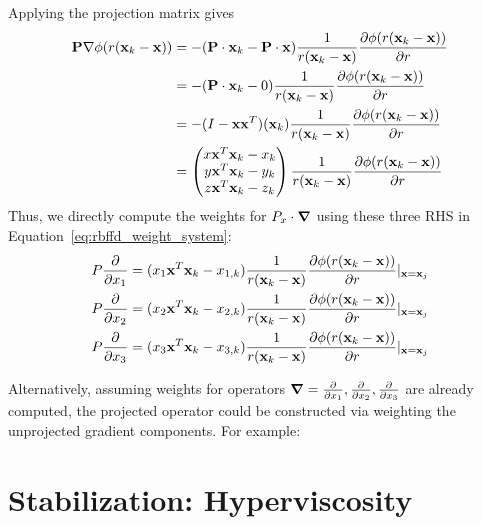 \documentclass{report}
\begin{document}
{Applying the projection matrix gives 
\begin{align*}
\mathbf{P} \nabla \phi(r(\mathbf{x}_k - \mathbf{x})) & = - (\mathbf{P} \cdot \mathbf{x}_k - \mathbf{P}\cdot\mathbf{x})\frac{1}{r(\mathbf{x}_k - \mathbf{x})} \frac{\partial \phi(r(\mathbf{x}_k - \mathbf{x}))}{\partial r} \\
& =  - (\mathbf{P}\cdot\mathbf{x}_k - 0)\frac{1}{r(\mathbf{x}_k - \mathbf{x})} \frac{\partial \phi(r(\mathbf{x}_k - \mathbf{x}))}{\partial r} \\
& = - (I-\mathbf{x}\mathbf{x}^T)(\mathbf{x}_k
)\frac{1}{r(\mathbf{x}_k - \mathbf{x})} \frac{\partial \phi(r(\mathbf{x}_k - \mathbf{x}))}{\partial r} \\
& = \begin{pmatrix} x \mathbf{x}^T \mathbf{x}_k - x_k \\ y \mathbf{x}^T \mathbf{x}_k -  y_k \\ z \mathbf{x}^T \mathbf{x}_k -z_k \end{pmatrix} \frac{1}{r(\mathbf{x}_k - \mathbf{x})} \frac{\partial \phi(r(\mathbf{x}_k - \mathbf{x}))}{\partial r} 
 \end{align*}
Thus, we directly compute the weights for $P_{x}\cdot\mbox{\boldmath$ \nabla $}$ using these three RHS in Equation~\ref{eq:rbffd_weight_system}: 
\begin{align} 
P\frac{\partial }{\partial x_1} = ( x_1 \mathbf{x}^T \mathbf{x}_k - x_{1,k}) \frac{1}{r(\mathbf{x}_k - \mathbf{x})} \frac{\partial \phi(r(\mathbf{x}_k - \mathbf{x}))}{\partial r} |_{\mathbf{x}=\mathbf{x}_j} \\
P\frac{\partial }{\partial x_2} = ( x_2 \mathbf{x}^T \mathbf{x}_k - x_{2,k}) \frac{1}{r(\mathbf{x}_k - \mathbf{x})} \frac{\partial \phi(r(\mathbf{x}_k - \mathbf{x}))}{\partial r} |_{\mathbf{x}=\mathbf{x}_j} \\
P\frac{\partial }{\partial x_3} = ( x_3 \mathbf{x}^T \mathbf{x}_k - x_{3,k}) \frac{1}{r(\mathbf{x}_k - \mathbf{x})} \frac{\partial \phi(r(\mathbf{x}_k - \mathbf{x}))}{\partial r} |_{\mathbf{x}=\mathbf{x}_j}
\end{align}

Alternatively, assuming weights for operators $\mbox{\boldmath$ \nabla $} = \frac{\partial }{\partial x_{1}}, \frac{\partial }{\partial x_{2}}, \frac{\partial }{\partial x_{3}}$ are already computed, the projected operator could be constructed via weighting the unprojected gradient components. For example: 



\section{Stabilization: Hyperviscosity}

}
\end{document}
